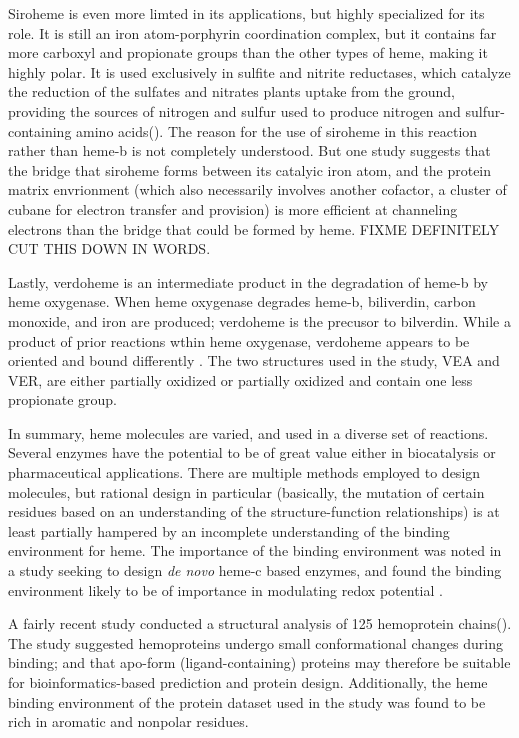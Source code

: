 \documentclass[a4paper, nobind]{templates/ociamthesis}
\begin{document}
Siroheme is even more limted in its applications, but highly specialized for its role. It is still an iron atom-porphyrin coordination complex, but it contains far more carboxyl and propionate groups than the other types of heme, making it highly polar. It is used exclusively in sulfite and nitrite reductases, which catalyze the reduction of the sulfates and nitrates plants uptake from the ground, providing the sources of nitrogen and sulfur used to produce nitrogen and sulfur-containing amino acids(\textcite{Tripathy2010}). The reason for the use of siroheme in this reaction rather than heme-b is not completely understood. But one study suggests that the bridge that siroheme forms between its catalyic iron atom, and the protein matrix envrionment (which also necessarily involves another cofactor, a cluster of cubane for electron transfer and provision) is more efficient at channeling electrons than the bridge that could be formed by heme.\autocite{Branzanic2019} FIXME DEFINITELY CUT THIS DOWN IN WORDS.

Lastly, verdoheme is an intermediate product in the degradation of heme-b by heme oxygenase. When heme oxygenase degrades heme-b, biliverdin, carbon monoxide, and iron are produced; verdoheme is the precusor to bilverdin\autocite{Lai2010,Sato2007}. While a product of prior reactions wthin heme oxygenase, verdoheme appears to be oriented and bound differently \autocite{Lad2004}. The two structures used in the study, VEA and VER, are either partially oxidized or partially oxidized and contain one less propionate group.

In summary, heme molecules are varied, and used in a diverse set of reactions. Several enzymes have the potential to be of great value either in biocatalysis or pharmaceutical applications. There are multiple methods employed to design molecules, but rational design in particular (basically, the mutation of certain residues based on an understanding of the structure-function relationships) is at least partially hampered by an incomplete understanding of the binding environment for heme. The importance of the binding environment was noted in a study seeking to design \emph{de novo} heme-c based enzymes, and found the binding environment likely to be of importance in modulating redox potential \autocite{Ishida2004}.

A fairly recent study conducted a structural analysis of 125 hemoprotein chains(\textcite{Li2011}). The study suggested hemoproteins undergo small conformational changes during binding; and that apo-form (ligand-containing) proteins may therefore be suitable for bioinformatics-based prediction and protein design. Additionally, the heme binding environment of the protein dataset used in the study was found to be rich in aromatic and nonpolar residues.
\end{document}
